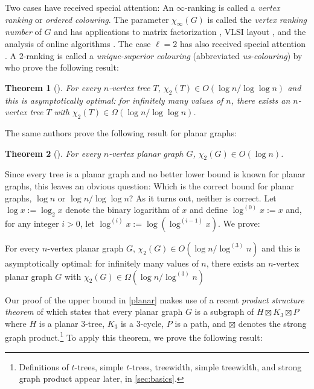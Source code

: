 \documentclass[kpfonts]{patmorin}
\newcommand{\trn}{\chi_2}
\newtheorem{othertheorem}{Theorem}
\theoremstyle{named}
\begin{document}
Two cases have received special attention: An $\infty$-ranking is called a \emph{vertex ranking} or \emph{ordered colouring}. The parameter $\chi_\infty(G)$ is called the \emph{vertex ranking number} of $G$ and has applications to matrix factorization \cite{bodlaender.gilbert.ea:approximating,duff.reid:multifrontal,liu:role,dereniowski.kubale:cholesky}, VLSI layout \cite{leiserson:area,sen.deng.ea:on}, and the analysis of online algorithms \cite{even.smorodinsky:hitting}. The case $\ell=2$ has also received special attention \cite{almeter.demircan.ea:graph,karpas.neiman.ea:on,shalu.antony:complexity}. A $2$-ranking is called a \emph{unique-superior colouring} (abbreviated \emph{us-colouring}) by \citet{karpas.neiman.ea:on} who prove the following result:

\setcounter{othertheorem}{19}
\begin{othertheorem}[\cite{karpas.neiman.ea:on}]\label{trees}
    For every $n$-vertex tree $T$, $\trn(T)\in O(\log n/\log\log n)$ and this is asymptotically optimal: for infinitely many values of $n$, there exists an $n$-vertex tree $T$ with $\trn(T)\in\Omega(\log n/\log\log n)$.
\end{othertheorem}

The same authors prove the following result for planar graphs:

\setcounter{othertheorem}{15}
\begin{othertheorem}[\cite{karpas.neiman.ea:on}]\label{planar-graphs}
    For every $n$-vertex planar graph $G$, $\trn(G)\in O(\log n)$.
\end{othertheorem}

Since every tree is a planar graph and no better lower bound is known for planar graphs, this leaves an obvious question:  Which is the correct bound for planar graphs, $\log n$ or $\log n/\log\log n$?  As it turns out, neither is correct.  Let $\log x :=\log_2 x$ denote the binary logarithm of $x$ and define $\log^{(0)}x:=x$ and, for any integer $i>0$, let $\log^{(i)}x:=\log(\log^{(i-1)} x)$. We prove:


\begin{thm}\label{planar}
    For every $n$-vertex planar graph $G$, $\trn(G)\in O(\log n/\log^{(3)} n)$ and this is asymptotically optimal: for infinitely many values of $n$, there exists an $n$-vertex planar graph $G$ with $\trn(G)\in \Omega(\log n/\log^{(3)} n)$
\end{thm}

Our proof of the upper bound in \cref{planar} makes use of a recent \emph{product structure theorem} of \citet{dujmovic.joret.ea:planar} which states that every planar graph $G$ is a subgraph of $H\boxtimes K_3\boxtimes P$ where $H$ is a planar $3$-tree, $K_3$ is a 3-cycle, $P$ is a path, and $\boxtimes$ denotes the strong graph product.\footnote{Definitions of $t$-trees, simple $t$-trees, treewidth, simple treewidth, and strong graph product appear later, in \cref{sec:basics}.}  To apply this theorem, we prove the following result:
\end{document}
